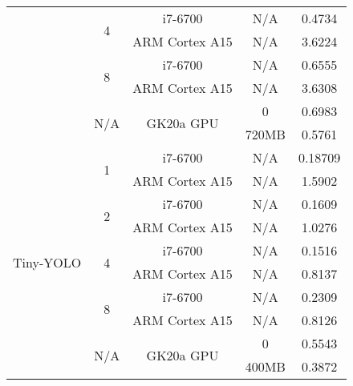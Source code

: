 \begin{table}[H]
\begin{center}
\begin{tabular}[center]{ | c | c | c | c | c | }
                                & \multirow{2}{*}{4}    & i7-6700 & N/A & 0.4734 \\ \cline{3-5}
                                &                       & ARM Cortex A15 & N/A & 3.6224 \\ \cline{2-5}
                                & \multirow{2}{*}{8}    & i7-6700 & N/A & 0.6555 \\ \cline{3-5}
                                &                       & ARM Cortex A15 & N/A & 3.6308 \\ \cline{2-5}
                                & \multirow{2}{*}{N/A}  & \multirow{2}{*}{GK20a GPU} & 0 & 0.6983 \\ \cline{4-5}
                                &                       &                            & 720MB & 0.5761 \\ \hline
      \multirow{10}{*}{Tiny-YOLO} & \multirow{2}{*}{1}    & i7-6700 & N/A & 0.18709 \\ \cline{3-5}
                                  &                       & ARM Cortex A15 & N/A & 1.5902 \\ \cline{2-5}
                                  & \multirow{2}{*}{2}    & i7-6700 & N/A & 0.1609 \\ \cline{3-5}
                                  &                       & ARM Cortex A15 & N/A & 1.0276 \\ \cline{2-5}
                                  & \multirow{2}{*}{4}    & i7-6700 & N/A & 0.1516 \\ \cline{3-5}
                                  &                       & ARM Cortex A15 & N/A & 0.8137 \\ \cline{2-5}
                                  & \multirow{2}{*}{8}    & i7-6700 & N/A & 0.2309 \\ \cline{3-5}
                                  &                       & ARM Cortex A15 & N/A & 0.8126 \\ \cline{2-5}
                                  & \multirow{2}{*}{N/A}  & \multirow{2}{*}{GK20a GPU} & 0 & 0.5543 \\ \cline{4-5}
                                  &                       &                            & 400MB & 0.3872 \\
      \hline
    \end{tabular}
  \end{center}
\end{table}

